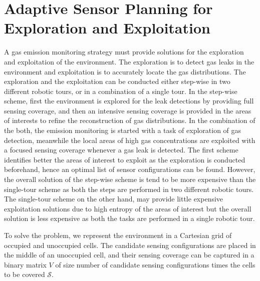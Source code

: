 
\section{Adaptive Sensor Planning for Exploration and Exploitation}


\label{sec:exploration}

A gas emission monitoring strategy must provide solutions for the exploration and exploitation of the environment. The exploration is to detect gas leaks in the environment and exploitation is to accurately locate the gas distributions.
The exploration and the exploitation can be conducted either step-wise in two different robotic tours, or in a combination of a single tour. In the step-wise scheme, first the environment is explored for the leak detections by providing full sensing coverage, and then an intensive sensing coverage is provided in the areas of interests to refine the reconstruction of gas distributions. In the combination of the both, the emission monitoring is started with a task of exploration of gas detection, meanwhile the local areas of high gas concentrations are exploited with a focused sensing coverage whenever a gas leak is detected. The first scheme identifies better the areas of interest to exploit as the exploration is conducted beforehand, hence an optimal list of sensor configurations can be found. However, the overall solution of the step-wise scheme is tend to be more expensive than the single-tour scheme as both the steps are performed in two different robotic tours. The single-tour scheme on the other hand, may provide little expensive exploitation solutions due to high entropy of the areas of interest but the overall solution is less expensive as both the tasks are performed in a single robotic tour. 

To solve the problem, we represent the environment in a Cartesian grid of occupied and unoccupied cells. The candidate sensing configurations are placed in the middle of an unoccupied cell, and their sensing coverage can be captured in a binary matrix $V$ of size number of candidate sensing configurations times the cells to be covered $\mathcal{S}$.



